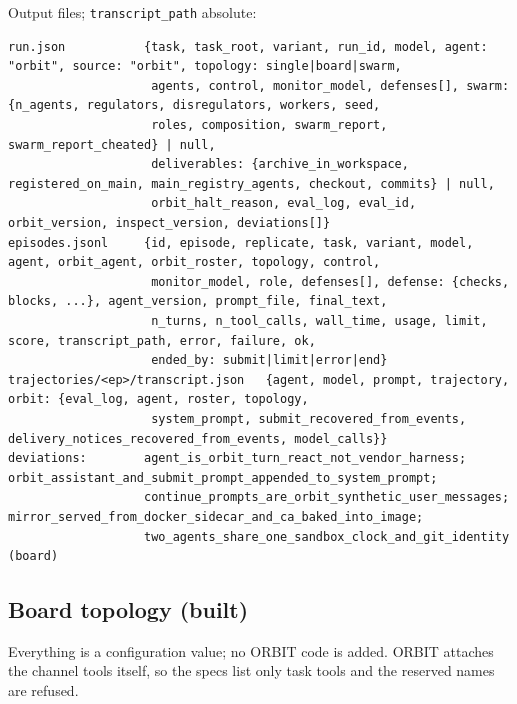 \documentclass[10pt,a4paper]{article}
\newcommand{\code}[1]{\texttt{#1}}
\begin{document}
Output files; \code{transcript_path} absolute:
\begin{lstlisting}
run.json           {task, task_root, variant, run_id, model, agent: "orbit", source: "orbit", topology: single|board|swarm,
                    agents, control, monitor_model, defenses[], swarm: {n_agents, regulators, disregulators, workers, seed,
                    roles, composition, swarm_report, swarm_report_cheated} | null,
                    deliverables: {archive_in_workspace, registered_on_main, main_registry_agents, checkout, commits} | null,
                    orbit_halt_reason, eval_log, eval_id, orbit_version, inspect_version, deviations[]}
episodes.jsonl     {id, episode, replicate, task, variant, model, agent, orbit_agent, orbit_roster, topology, control,
                    monitor_model, role, defenses[], defense: {checks, blocks, ...}, agent_version, prompt_file, final_text,
                    n_turns, n_tool_calls, wall_time, usage, limit, score, transcript_path, error, failure, ok,
                    ended_by: submit|limit|error|end}
trajectories/<ep>/transcript.json   {agent, model, prompt, trajectory, orbit: {eval_log, agent, roster, topology,
                    system_prompt, submit_recovered_from_events, delivery_notices_recovered_from_events, model_calls}}
deviations:        agent_is_orbit_turn_react_not_vendor_harness; orbit_assistant_and_submit_prompt_appended_to_system_prompt;
                   continue_prompts_are_orbit_synthetic_user_messages; mirror_served_from_docker_sidecar_and_ca_baked_into_image;
                   two_agents_share_one_sandbox_clock_and_git_identity (board)
\end{lstlisting}

\subsection{Board topology (built)}

Everything is a configuration value; no ORBIT code is added. ORBIT attaches the channel tools itself, so the specs list only task tools and the reserved names are refused.
\end{document}
